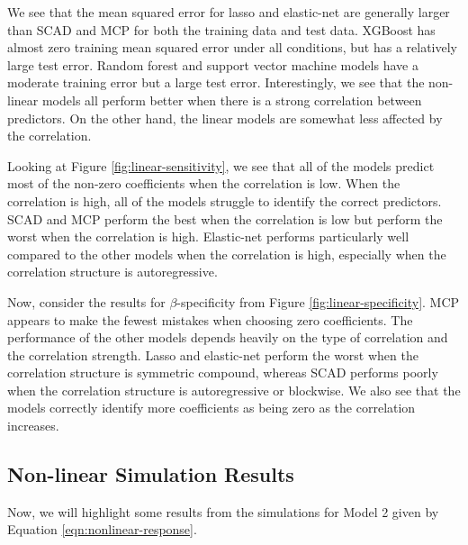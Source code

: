 \documentclass{article}
\begin{document}
	We see that the mean squared error for lasso and elastic-net are generally larger than SCAD and MCP for both the training data and test data. XGBoost has almost zero training mean squared error under all conditions, but has a relatively large test error. Random forest and support vector machine models have a moderate training error but a large test error. Interestingly, we see that the non-linear models all perform better when there is a strong correlation between predictors. On the other hand, the linear models are somewhat less affected by the correlation.
	
	Looking at Figure \ref{fig:linear-sensitivity}, we see that all of the models predict most of the non-zero coefficients when the correlation is low. When the correlation is high, all of the models struggle to identify the correct predictors. SCAD and MCP perform the best when the correlation is low but perform the worst when the correlation is high. Elastic-net performs particularly well compared to the other models when the correlation is high, especially when the correlation structure is autoregressive.
	
	Now, consider the results for $\beta$-specificity from Figure \ref{fig:linear-specificity}. MCP appears to make the fewest mistakes when choosing zero coefficients. The performance of the other models depends heavily on the type of correlation and the correlation strength. Lasso and elastic-net perform the worst when the correlation structure is symmetric compound, whereas SCAD performs poorly when the correlation structure is autoregressive or blockwise. We also see that the models correctly identify more coefficients as being zero as the correlation increases.
	
	\subsection{Non-linear Simulation Results}
	Now, we will highlight some results from the simulations for Model 2 given by Equation \ref{eqn:nonlinear-response}.
	
\end{document}
